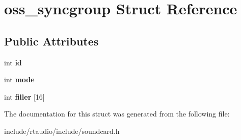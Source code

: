 \hypertarget{structoss__syncgroup}{}\section{oss\+\_\+syncgroup Struct Reference}
\label{structoss__syncgroup}
\subsection*{Public Attributes}
\begin{DoxyCompactItemize}
\item 
int {\bfseries id}\hypertarget{structoss__syncgroup_a36b8aff5ff2552c5382b80ee1022dde8}{}\label{structoss__syncgroup_a36b8aff5ff2552c5382b80ee1022dde8}

\item 
int {\bfseries mode}\hypertarget{structoss__syncgroup_ae2e8770ba883f4445c10291c2f62f106}{}\label{structoss__syncgroup_ae2e8770ba883f4445c10291c2f62f106}

\item 
int {\bfseries filler} \mbox{[}16\mbox{]}\hypertarget{structoss__syncgroup_a5f0372084fd41e728a1e57d1d1ddf42f}{}\label{structoss__syncgroup_a5f0372084fd41e728a1e57d1d1ddf42f}

\end{DoxyCompactItemize}


The documentation for this struct was generated from the following file\+:\begin{DoxyCompactItemize}
\item 
include/rtaudio/include/soundcard.\+h\end{DoxyCompactItemize}
